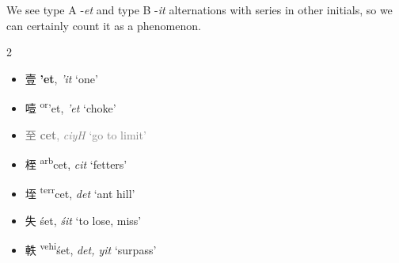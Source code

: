 We see type A -\textit{et} and type B -\textit{it} alternations with series in other initials, so we can certainly count it as a phenomenon. 

\begin{multicols}{2}
\raggedcolumns
\begin{itemize}
  \item {\Large{壹}} %
    {\large{\textbf{'et}}},
    \textit{'it} `one' %

  \item {\Large{噎}} %
    {\large{{\textsuperscript{or}}'et}},
    \textit{'et} `choke' %
\end{itemize}

\medskip



\begin{minipage}{\columnwidth}
\begin{itemize}[leftmargin=*, labelsep=0.5em]   
  \item \textcolor{gray}{{\Large{至}} %
    {\large{\textbf{cet}}},
    \textit{ciyH} `go to limit'} %

  \item {\Large{桎}} %
    {\large{{\textsuperscript{arb}}cet}},
    \textit{cit} `fetters' %




  \item {\Large{垤}} %
    {\large{{\textsuperscript{terr}}cet}},
    \textit{det} `ant hill' %
\end{itemize}
\end{minipage}

\medskip

\begin{itemize}
  \item {\Large{失}} %
    {\large{śet}},
    \textit{śit} `to lose, miss' %

   \item {\Large{軼}} %
    {\large{{\textsuperscript{vehi}}śet}},
    \textit{det, yit} `surpass' %


\end{itemize}
\end{multicols}
